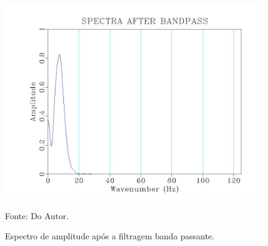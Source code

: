 \begin{figure}
\caption{Espectro de amplitude após a filtragem banda passante.}
\begin{center}
\includegraphics[scale=0.4]{images/filteredSpectra.jpeg}
\vspace{-0.3cm}
\end{center}
\begin{center}
 Fonte: Do Autor.
\end{center}
\label{fig:7.5}
\end{figure}

